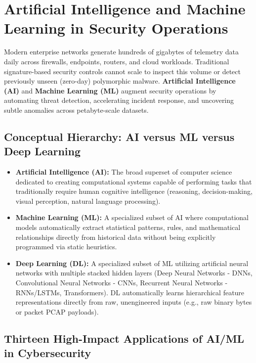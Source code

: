 \section{Artificial Intelligence and Machine Learning in Security Operations}

Modern enterprise networks generate hundreds of gigabytes of telemetry data daily across firewalls, endpoints, routers, and cloud workloads. Traditional signature-based security controls cannot scale to inspect this volume or detect previously unseen (zero-day) polymorphic malware. \textbf{Artificial Intelligence (AI)} and \textbf{Machine Learning (ML)} augment security operations by automating threat detection, accelerating incident response, and uncovering subtle anomalies across petabyte-scale datasets.

\subsection{Conceptual Hierarchy: AI versus ML versus Deep Learning}

\begin{itemize}
\item \textbf{Artificial Intelligence (AI):} The broad superset of computer science dedicated to creating computational systems capable of performing tasks that traditionally require human cognitive intelligence (reasoning, decision-making, visual perception, natural language processing).
\item \textbf{Machine Learning (ML):} A specialized subset of AI where computational models automatically extract statistical patterns, rules, and mathematical relationships directly from historical data without being explicitly programmed via static heuristics.
\item \textbf{Deep Learning (DL):} A specialized subset of ML utilizing artificial neural networks with multiple stacked hidden layers (Deep Neural Networks - DNNs, Convolutional Neural Networks - CNNs, Recurrent Neural Networks - RNNs/LSTMs, Transformers). DL automatically learns hierarchical feature representations directly from raw, unengineered inputs (e.g., raw binary bytes or packet PCAP payloads).
\end{itemize}

\subsection{Thirteen High-Impact Applications of AI/ML in Cybersecurity}


